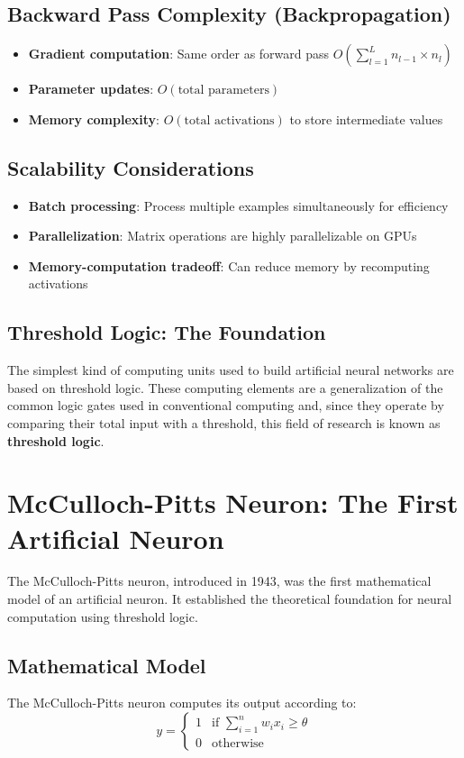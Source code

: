 \subsection{Backward Pass Complexity (Backpropagation)}
\begin{itemize}
    \item \textbf{Gradient computation}: Same order as forward pass \(O(\sum_{l=1}^{L} n_{l-1} \times n_l)\)
    \item \textbf{Parameter updates}: \(O(\text{total parameters})\)
    \item \textbf{Memory complexity}: \(O(\text{total activations})\) to store intermediate values
\end{itemize}

\subsection{Scalability Considerations}
\begin{itemize}
    \item \textbf{Batch processing}: Process multiple examples simultaneously for efficiency
    \item \textbf{Parallelization}: Matrix operations are highly parallelizable on GPUs
    \item \textbf{Memory-computation tradeoff}: Can reduce memory by recomputing activations
\end{itemize}

\subsection{Threshold Logic: The Foundation}
The simplest kind of computing units used to build artificial neural networks are based on threshold logic. These computing elements are a generalization of the common logic gates used in conventional computing and, since they operate by comparing their total input with a threshold, this field of research is known as \textbf{threshold logic}.

\section{McCulloch-Pitts Neuron: The First Artificial Neuron}
The McCulloch-Pitts neuron, introduced in 1943, was the first mathematical model of an artificial neuron. It established the theoretical foundation for neural computation using threshold logic.

\subsection{Mathematical Model}
The McCulloch-Pitts neuron computes its output according to:
\[
y = \begin{cases}
 1 & \text{if } \displaystyle\sum_{i=1}^{n} w_i x_i \geq \theta \\
 0 & \text{otherwise}
\end{cases}
\]

